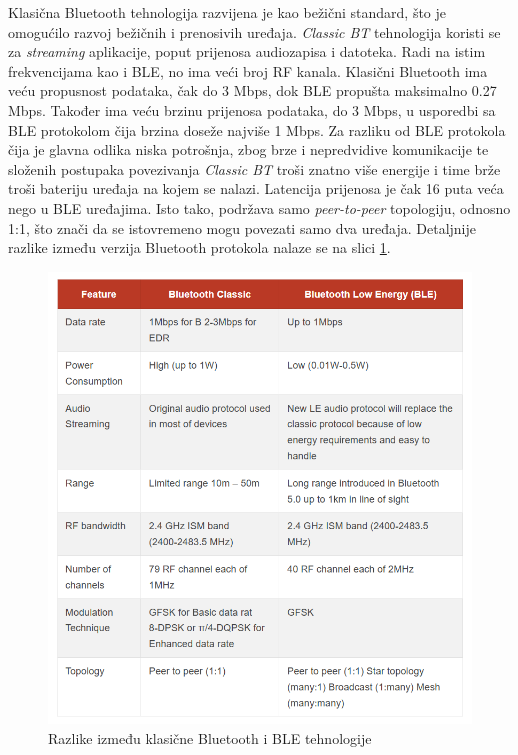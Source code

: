 Klasična Bluetooth tehnologija razvijena je kao bežični standard, što je omogućilo razvoj bežičnih i prenosivih uređaja. \textit{Classic BT} tehnologija koristi se za \textit{streaming} aplikacije, poput prijenosa audiozapisa i datoteka. Radi na istim frekvencijama kao i BLE, no ima veći broj RF kanala. Klasični Bluetooth ima veću propusnost podataka, čak do 3 Mbps, dok BLE propušta maksimalno 0.27 Mbps. Također ima veću brzinu prijenosa podataka, do 3 Mbps, u usporedbi sa BLE protokolom čija brzina doseže najviše 1 Mbps. Za razliku od BLE protokola čija je glavna odlika niska potrošnja,  zbog brze i nepredvidive komunikacije te složenih postupaka povezivanja \textit{Classic BT} troši znatno više energije i time brže troši bateriju uređaja na kojem se nalazi. Latencija prijenosa je čak 16 puta veća nego u BLE uređajima. Isto tako, podržava samo \textit{peer-to-peer} topologiju, odnosno 1:1, što znači da se istovremeno mogu povezati samo dva uređaja. Detaljnije razlike između verzija Bluetooth protokola nalaze se na slici \ref{fig:blevsbt}. \cite{blevsbt}

\begin{figure}[ht]
	\centering
	\includegraphics[scale=0.6]{imgs/blevsbt}
	\caption{Razlike između klasične Bluetooth i BLE tehnologije \cite{blevsbt}}
	\label{fig:blevsbt}
\end{figure}

